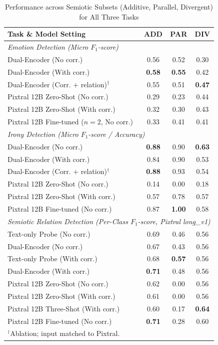 \begin{table}[!t]
\centering
\caption{Performance across Semiotic Subsets (Additive, Parallel, Divergent) for All Three Tasks}
\label{tab:semiotic_subsets_all}
\footnotesize
\renewcommand{\arraystretch}{1.02}
\begin{tabular}{l c c c}
\hline
\textbf{Task \& Model Setting} & \textbf{ADD} & \textbf{PAR} & \textbf{DIV} \\
\hline
\multicolumn{4}{l}{\textit{Emotion Detection (Micro $F_1$-score)}} \\
Dual-Encoder (No corr.) & 0.56 & 0.52 & 0.30 \\
Dual-Encoder (With corr.) & \textbf{0.58} & \textbf{0.55} & 0.42 \\
Dual-Encoder (Corr. + relation)$^{\dagger}$ & 0.55 & 0.51 & \textbf{0.47} \\
Pixtral 12B Zero-Shot (No corr.) & 0.29 & 0.23 & 0.44 \\
Pixtral 12B Zero-Shot (With corr.) & 0.32 & 0.30 & 0.43 \\
Pixtral 12B Fine-tuned ($n=2$, No corr.) & 0.33 & 0.41 & 0.41 \\
\hline
\multicolumn{4}{l}{\textit{Irony Detection (Micro $F_1$-score / Accuracy)}} \\
Dual-Encoder (No corr.) & \textbf{0.88} & 0.90 & \textbf{0.63} \\
Dual-Encoder (With corr.) & 0.84 & 0.90 & 0.53 \\
Dual-Encoder (Corr. + relation)$^{\dagger}$ & \textbf{0.88} & 0.93 & 0.54 \\
Pixtral 12B Zero-Shot (No corr.) & 0.14 & 0.00 & 0.18 \\
Pixtral 12B Zero-Shot (With corr.) & 0.57 & 0.78 & 0.57 \\
Pixtral 12B Fine-tuned (No corr.) & 0.87 & \textbf{1.00} & 0.58 \\
\hline
\multicolumn{4}{l}{\textit{Semiotic Relation Detection (Per-Class $F_1$-score, Pixtral long\_v1)}} \\
Text-only Probe (No corr.) & 0.69 & 0.46 & 0.56 \\
Dual-Encoder (No corr.) & 0.67 & 0.43 & 0.56 \\
Text-only Probe (With corr.) & 0.68 & \textbf{0.57} & 0.56 \\
Dual-Encoder (With corr.) & \textbf{0.71} & 0.48 & 0.56 \\
Pixtral 12B Zero-Shot (No corr.) & 0.62 & 0.00 & 0.56 \\
Pixtral 12B Zero-Shot (With corr.) & 0.61 & 0.00 & 0.56 \\
Pixtral 12B Three-Shot (With corr.) & 0.60 & 0.17 & \textbf{0.64} \\
Pixtral 12B Fine-tuned (No corr.) & \textbf{0.71} & 0.28 & 0.60 \\
\hline
\multicolumn{4}{p{0.88\columnwidth}}{\footnotesize $^{\dagger}$Ablation; input matched to Pixtral.} \\
\end{tabular}
\end{table}


